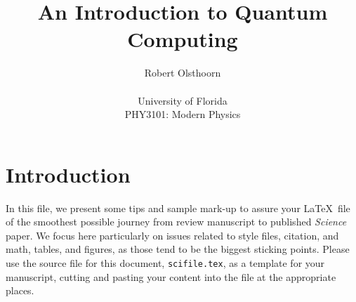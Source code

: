 \documentclass[12pt]{article}
\title{An Introduction to Quantum Computing}
\author
{Robert Olsthoorn\\
\\
\normalsize{University of Florida}\\
\normalsize{PHY3101: Modern Physics}\\
}
\date{}
\newenvironment{sciabstract}{%
\begin{quote} \bf}
{\end{quote}}
\begin{document}
 


\baselineskip24pt


\maketitle 




\begin{sciabstract}
  
\end{sciabstract}




\section*{Introduction}

In this file, we present some tips and sample mark-up to assure your
\LaTeX\ file of the smoothest possible journey from review manuscript
to published {\it Science\/} paper.  We focus here particularly on
issues related to style files, citation, and math, tables, and
figures, as those tend to be the biggest sticking points.  Please use
the source file for this document, \texttt{scifile.tex}, as a template
for your manuscript, cutting and pasting your content into the file at
the appropriate places.
\end{document}
